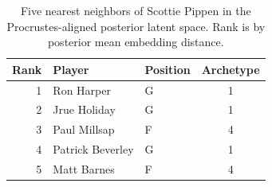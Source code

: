 \begin{table}[htbp]
  \centering\small
  \begin{tabular}{rllc}
    \toprule
    Rank & Player & Position & Archetype \\
    \midrule
    1 & Ron Harper & G & 1 \\
    2 & Jrue Holiday & G & 1 \\
    3 & Paul Millsap & F & 4 \\
    4 & Patrick Beverley & G & 1 \\
    5 & Matt Barnes & F & 4 \\
    \bottomrule
  \end{tabular}
  \caption{Five nearest neighbors of Scottie Pippen in the Procrustes-aligned posterior latent space. Rank is by posterior mean embedding distance.}
  \label{tab:Scottie_Pippen_neighbors}
\end{table}

